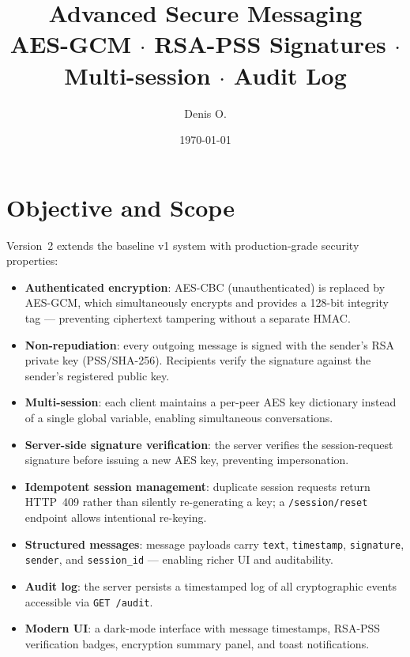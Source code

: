 \documentclass[12pt,a4paper]{article}
\title{%
  \vspace{-1cm}
  \textbf{Advanced Secure Messaging}\\[6pt]
  \large AES-GCM $\cdot$ RSA-PSS Signatures $\cdot$ Multi-session $\cdot$ Audit Log
}
\author{Denis O.}
\date{\today}
\begin{document}
\maketitle
\tableofcontents

\section{Objective and Scope}

Version~2 extends the baseline v1 system with production-grade security properties:

\begin{itemize}[noitemsep]
  \item \textbf{Authenticated encryption}: AES-CBC (unauthenticated) is replaced by AES-GCM, which simultaneously encrypts and provides a 128-bit integrity tag --- preventing ciphertext tampering without a separate HMAC.
  \item \textbf{Non-repudiation}: every outgoing message is signed with the sender's RSA private key (PSS/SHA-256). Recipients verify the signature against the sender's registered public key.
  \item \textbf{Multi-session}: each client maintains a per-peer AES key dictionary instead of a single global variable, enabling simultaneous conversations.
  \item \textbf{Server-side signature verification}: the server verifies the session-request signature before issuing a new AES key, preventing impersonation.
  \item \textbf{Idempotent session management}: duplicate session requests return HTTP~409 rather than silently re-generating a key; a \texttt{/session/reset} endpoint allows intentional re-keying.
  \item \textbf{Structured messages}: message payloads carry \texttt{text}, \texttt{timestamp}, \texttt{signature}, \texttt{sender}, and \texttt{session\_id} --- enabling richer UI and auditability.
  \item \textbf{Audit log}: the server persists a timestamped log of all cryptographic events accessible via \texttt{GET /audit}.
  \item \textbf{Modern UI}: a dark-mode interface with message timestamps, RSA-PSS verification badges, encryption summary panel, and toast notifications.
\end{itemize}

\end{document}
